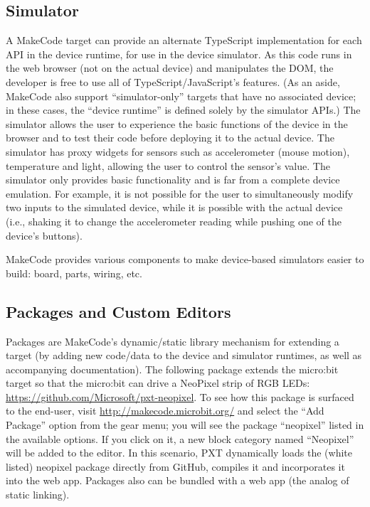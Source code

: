 \subsection{Simulator}

A MakeCode target can provide an alternate TypeScript implementation for each API in the device runtime, for use in the device
simulator. As this code runs in the web browser (not on the actual device) and manipulates the DOM, the developer is free to
use all of TypeScript/JavaScript's features. (As an aside, MakeCode also support ``simulator-only'' targets that have no 
associated device; in these cases, the ``device runtime'' is defined solely by the simulator APIs.) 
The simulator allows the user to experience the basic functions of the device in the browser and to test their code
before deploying it to the actual device. The simulator has proxy widgets for sensors such as accelerometer (mouse motion),
temperature and light, allowing the user to control the sensor's value.  The simulator only provides basic functionality
and is far from a complete device emulation.   For example, it is not possible for the user to simultaneously modify two
inputs to the simulated device, while it is possible with the actual device (i.e., shaking it to change the accelerometer
reading while pushing one of the device's buttons).

MakeCode provides various components to make device-based simulators easier to build: board, parts, wiring, etc.

\subsection{Packages and Custom Editors}

Packages are MakeCode's dynamic/static library mechanism for extending a target (by adding new code/data to the device
and simulator runtimes, as well as accompanying documentation). The following package extends the micro:bit target so
that the micro:bit can drive a NeoPixel strip of RGB LEDs: \url{https://github.com/Microsoft/pxt-neopixel}. To see how this
package is surfaced to the end-user, visit \url{http://makecode.microbit.org/} and select the ``Add Package'' option from the
gear menu; you will see the package ``neopixel'' listed in the available options. If you click on it, a new block category
named ``Neopixel'' will be added to the editor. In this scenario, PXT dynamically loads the (white listed) neopixel 
package directly from GitHub, compiles it and incorporates it into the web app. Packages also can be bundled with a web
app (the analog of static linking).  

